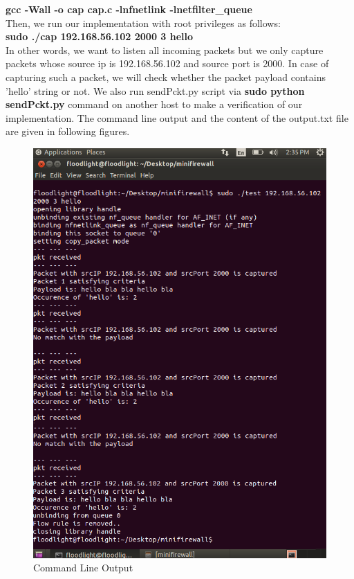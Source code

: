 \documentclass[paper=a4, fontsize=11pt]{scrartcl}
\numberwithin{equation}{section}		%
\numberwithin{figure}{section}			%
\numberwithin{table}{section}				%
\begin{document}
\textbf{gcc -Wall -o cap cap.c -lnfnetlink -lnetfilter\_queue} \\

Then, we run our implementation with root privileges as follows: \\

\textbf{sudo ./cap 192.168.56.102 2000 3 hello} \\

In other words, we want to listen all incoming packets but we only capture packets whose source ip is 192.168.56.102 and source port is 2000. In case of capturing such a packet, we will check whether the packet payload contains 'hello' string or not. We also run sendPckt.py script via \textbf{sudo python sendPckt.py} command on another host to make a verification of our implementation. The command line output and the content of the output.txt file are given in following figures. 

\begin{figure}[H]
\centering
\includegraphics[width=\textwidth]{img/example.png}
\caption{Command Line Output}
\end{figure}
\end{document}
